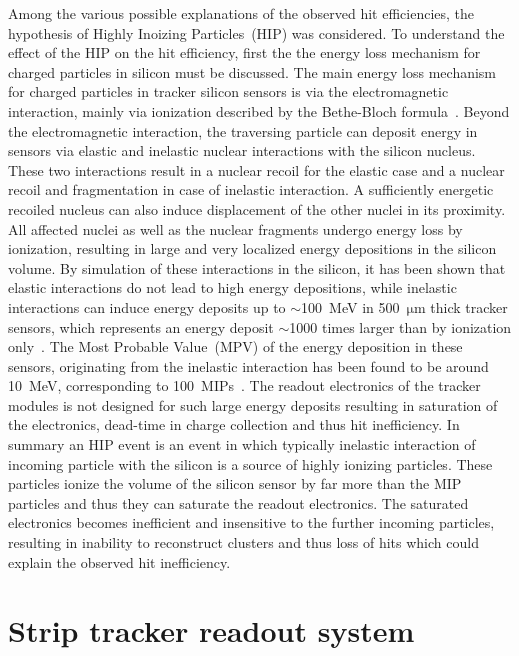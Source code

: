 Among the various possible explanations of the observed hit efficiencies, the hypothesis of Highly Inoizing Particles~(HIP) was considered. To understand the effect of the HIP on the hit efficiency, first the the energy loss mechanism for charged particles in silicon must be discussed. The main energy loss mechanism for charged particles in tracker silicon sensors is via the electromagnetic interaction, mainly via ionization described by the Bethe-Bloch formula~\cite{Groom:2000sm}. Beyond the electromagnetic interaction, the traversing particle can deposit energy in sensors via elastic and inelastic nuclear interactions with the silicon nucleus. These two interactions result in a nuclear recoil for the elastic case and a nuclear recoil and fragmentation in case of inelastic interaction. A sufficiently energetic recoiled nucleus can also induce displacement of the other nuclei in its proximity. All affected nuclei as well as the nuclear fragments undergo energy loss by ionization, resulting in large and very localized energy depositions in the silicon volume. By simulation of these interactions in the silicon, it has been shown that elastic interactions do not lead to high energy depositions, while inelastic interactions can induce energy deposits up to $\sim$100~MeV in 500~$\mathrm{\mu m}$ thick tracker sensors, which represents an energy deposit $\sim$1000 times larger than by ionization only~\cite{Huhtinen:2002yda}. The Most Probable Value~(MPV) of the energy deposition in these sensors, originating from the inelastic interaction has been found to be around 10~MeV, corresponding to 100~MIPs~\cite{Adam:2005pz}. The readout electronics of the tracker modules is not designed for such large energy deposits resulting in saturation of the electronics, dead-time in charge collection and thus hit inefficiency. In summary an HIP event is an event in which typically inelastic interaction of incoming particle with the silicon is a source of highly ionizing particles. These particles ionize the volume of the silicon sensor by far more than the MIP particles and thus they can saturate the readout electronics. The saturated electronics becomes inefficient and insensitive to the further incoming particles, resulting in inability to reconstruct clusters and thus loss of hits which could explain the observed hit inefficiency.


\section{Strip tracker readout system}

